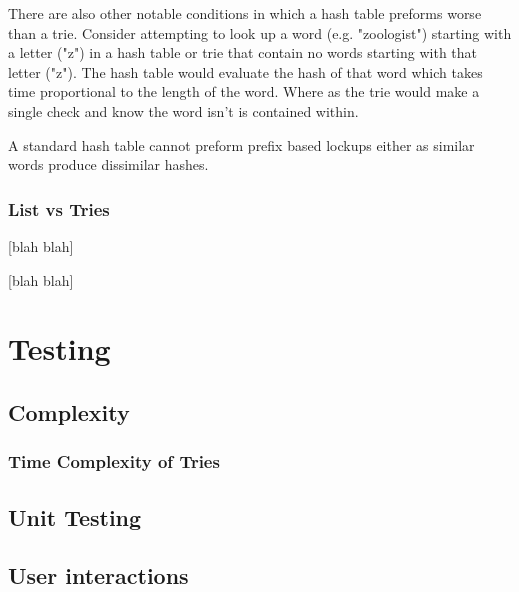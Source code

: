\documentclass[10pt]{article} %
\begin{document}
			    There are also other notable conditions in which a hash table preforms worse than a trie. Consider attempting to look up a word (e.g. "zoologist") starting with a letter ("z") in a hash table or trie that contain no words starting with that letter ("z"). The hash table would evaluate the hash of that word which takes time proportional to the length of the word. Where as the trie would make a single check and know the word isn't is contained within.
			    
			    A standard hash table cannot preform prefix based lockups either as similar words produce dissimilar hashes.
			    
			    
			    
			\subsubsection{List vs Tries}
			    [blah blah]
			    
			    [blah blah]
			
	\section{Testing}
		\subsection{Complexity}
			\subsubsection{Time Complexity of Tries}
				

				
		\subsection{Unit Testing}
		\subsection{User interactions}
		
	\newpage
	\printbibliography
	\newpage
	
\end{document}

